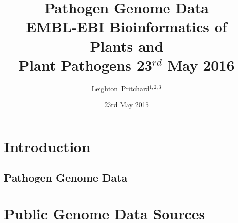 

%



\title[Pathogen Genome Data] %
{Pathogen Genome Data \\
{\small EMBL-EBI Bioinformatics of Plants and \\ Plant Pathogens 23$^{rd}$ May 2016}}
\author[Leighton Pritchard] %
{Leighton~Pritchard$^{1,2,3}$}
\date[23rd May 2016] %
{23rd May 2016}
\subject{Bioinformatics, Genomics, Plant Pathogens, Plants, Microbiology, Microbes, Comparative Genomics, Visualisation}





\frame[plain]{\titlepage}



\section{Introduction}

\subsection{Pathogen Genome Data}


\section{Public Genome Data Sources}

